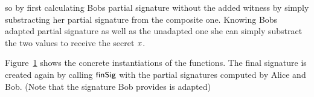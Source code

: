 \begin{definition}
\begin{itemize}
        so by first calculating Bobs partial signature without the added witness by simply substracting her partial signature from the composite one. Knowing Bobs adapted partial signature as well as the unadapted one she
        can simply substract the two values to receive the secret $\mathit{x}$.
    \end{itemize}
    Figure~\ref{fig:aptSchnorr} shows the concrete instantiations of the functions. The final signature is created again by calling $\mathsf{finSig}$ with the partial signatures computed by Alice and Bob. (Note that the
    signature Bob provides is adapted)
\end{definition}

\begin{figure}\label{fig:aptSchnorr}
    \fbox{
        \parbox{\textwidth} {
            \procedure[linenumbering, syntaxhighlight=auto]{$\procSetupApt{\varSecParam}$} {
                (\varKeyPair, (\varNonce, \varRand)) \opFunResult \procSetupPartSig{\varSecParam} \\
                \varWit \sample \cnstIntegersPrimeWithoutZero{\varPrime} \\
                \pcreturn (\varKeyPair, (\varNonce, \varRand), (\varWit, \varGWit))
            }
            \procedure[linenumbering, syntaxhighlight=auto]{$\procGenPtAptSig{\varMsg}{\varSecKeyAlice}{\varNonceAlice}{\varPubKeyBob}{\varRandBob}{\varWit}$}{
                \varSigBob \opFunResult \procGenPartSig{\varMsg}{\varSecKeyAlice}{\varNonceAlice}{\varPubKeyBob}{\varRandBob} \\
                \varS \opAssign \opAccess{\varSigBob}{\varS} \opAddScalar \varWit \\
                \pcreturn \varSigAptAlice \opAssign (\varS \opSeperate \varGWit)
            } \\[2\baselineskip]
            \procedure[linenumbering, syntaxhighlight=auto]{$\procVrfApt{\varMsg}{\varSecKeyAlice}{\varNonceAlice}{\varPubKeyBob}{\varRandBob}{\funGen{\varWit}}{\varSigAptBob}$} {
                \varSchnorrChallenge \opAssign \funHash{\varMsg \opConc \varPubKeyAlice \opAddPoint \varPubKeyBob \opConc \varRandAlice \opAddPoint \varRandBob} \\
                \pcreturn \funGen{\varSigAptBob} \opEq \opPointScalar{\varRandBob}{\varSchnorrChallenge} \opAddPoint \varPubKeyBob \opAddPoint \funGen{\varWit}
            }
            \procedure[linenumbering, syntaxhighlight=auto]{$\procFinAptSig{\varSigAlice}{\varSigAptBob}{\varRandAlice}{\varRandBob}{\varWit}$}{
                \varSigBob \opAssign \varSigAptBob \opSub \varWit \\
}}}
\end{figure}
